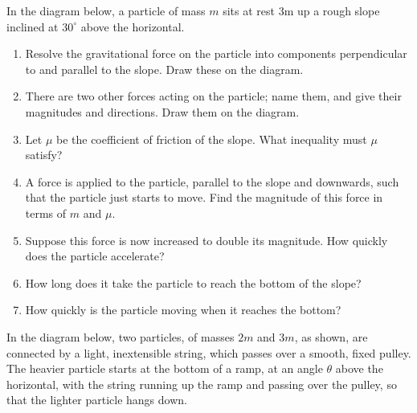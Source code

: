 \documentclass{article}
\begin{document}
\clearpage

In the diagram below, a particle of mass $m$ sits at rest 3m up a rough slope inclined at $30^\circ$ above the horizontal.

\begin{center}
\end{center}




\begin{enumerate}
	\item Resolve the gravitational force on the particle into components perpendicular to and parallel to the slope. Draw these on the diagram.
	\item There are two other forces acting on the particle; name them, and give their magnitudes and directions. Draw them on the diagram.
	\item Let $\mu$ be the coefficient of friction of the slope. What inequality must $\mu$ satisfy?
	\item A force is applied to the particle, parallel to the slope and downwards, such that the particle just starts to move. Find the magnitude of this force in terms of $m$ and $\mu$.
	\item Suppose this force is now increased to double its magnitude. How quickly does the particle accelerate?
	\item How long does it take the particle to reach the bottom of the slope?
	\item How quickly is the particle moving when it reaches the bottom?
\end{enumerate}




\clearpage




In the diagram below, two particles, of masses $2m$ and $3m$, as shown, are connected by a light, inextensible string, which passes over a smooth, fixed pulley. The heavier particle starts at the bottom of a ramp, at an angle $\theta$ above the horizontal, with the string running up the ramp and passing over the pulley, so that the lighter particle hangs down.
\end{document}
